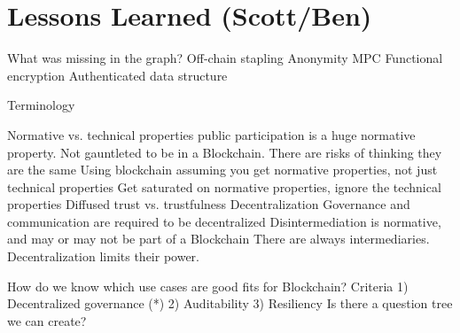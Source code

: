 
\section{Lessons Learned (Scott/Ben)}

What was missing in the graph?
	Off-chain stapling
	Anonymity
		MPC
		Functional encryption
	Authenticated data structure

Terminology

Normative vs. technical properties
	public participation is a huge normative property. Not gauntleted to be in a Blockchain.
	There are risks of thinking they are the same
		Using blockchain assuming you get normative properties, not just technical properties
		Get saturated on normative properties, ignore the technical properties
	Diffused trust vs. trustfulness
	Decentralization
		Governance and communication are required to be decentralized
		Disintermediation is normative, and may or may not be part of a Blockchain
			There are always intermediaries. Decentralization limits their power.



How do we know which use cases are good fits for Blockchain?
Criteria
	1) Decentralized governance (*)
	2) Auditability
	3) Resiliency	
Is there a question tree we can create?